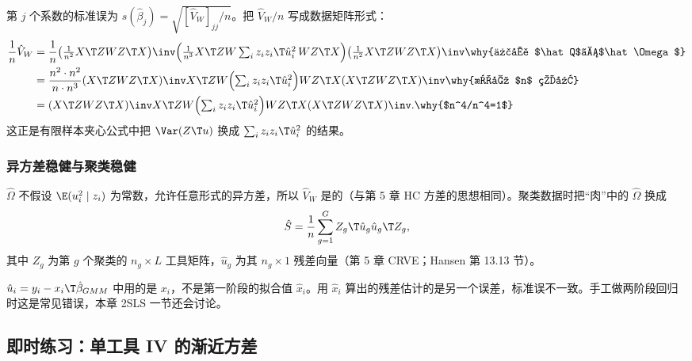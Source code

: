 第 $j$ 个系数的标准误为 $s(\hat\beta_j)=\sqrt{[\hat V_W]_{jj}/n}$。把 $\hat V_W/n$ 写成数据矩阵形式：
\begin{align*}
\frac1n\hat V_W
&=\frac1n\bigl(\tfrac{1}{n^2}X\T ZWZ\T X\bigr)\inv\Bigl(\tfrac{1}{n^3}X\T ZW\textstyle\sum_iz_iz_i\T\hat u_i^2\,WZ\T X\Bigr)\bigl(\tfrac{1}{n^2}X\T ZWZ\T X\bigr)\inv \why{代入 $\hat Q$、$\hat\Omega$}\\
&=\frac{n^2\cdot n^2}{n\cdot n^3}(X\T ZWZ\T X)\inv X\T ZW\Bigl(\textstyle\sum_iz_iz_i\T\hat u_i^2\Bigr)WZ\T X(X\T ZWZ\T X)\inv \why{提出 $n$ 的幂}\\
&=(X\T ZWZ\T X)\inv X\T ZW\Bigl(\textstyle\sum_iz_iz_i\T\hat u_i^2\Bigr)WZ\T X(X\T ZWZ\T X)\inv. \why{$n^4/n^4=1$}
\end{align*}
这正是有限样本夹心公式中把 $\Var(Z\T u)$ 换成 $\sum_iz_iz_i\T\hat u_i^2$ 的结果。

\subsubsection{异方差稳健与聚类稳健}

$\hat\Omega$ 不假设 $\E(u_i^2\mid z_i)$ 为常数，允许任意形式的异方差，所以 $\hat V_W$ 是的（与第 5 章 HC 方差的思想相同）。聚类数据时把“肉”中的 $\hat\Omega$ 换成
\[
\hat S=\frac1n\sum_{g=1}^G Z_g\T\hat u_g\hat u_g\T Z_g ,
\]
其中 $Z_g$ 为第 $g$ 个聚类的 $n_g\times L$ 工具矩阵，$\hat u_g$ 为其 $n_g\times1$ 残差向量（第 5 章 CRVE；Hansen 第 13.13 节）。

\begin{note}[残差必须用原始的 $x_i$ 计算]
$\hat u_i=y_i-x_i\T\hat\beta_{GMM}$ 中用的是 $x_i$，不是第一阶段的拟合值 $\hat x_i$。用 $\hat x_i$ 算出的残差估计的是另一个误差，标准误不一致。手工做两阶段回归时这是常见错误，本章 2SLS 一节还会讨论。
\end{note}

\subsection{即时练习：单工具 IV 的渐近方差}

